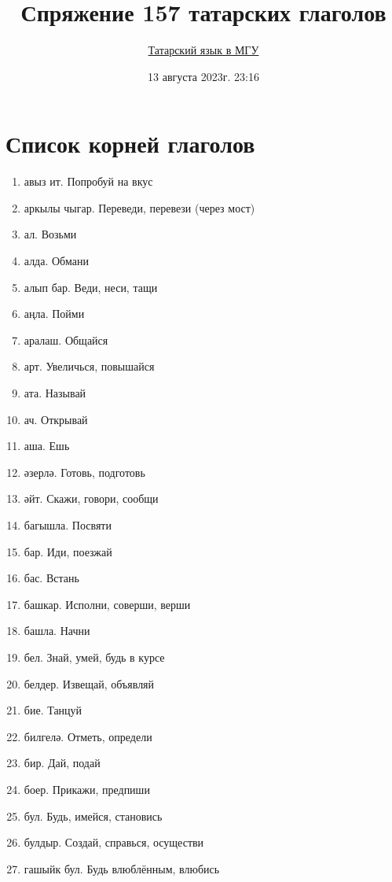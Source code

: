\documentclass{article}
\begin{document}
\title{\LARGE{\textbf{Спряжение 157 татарских глаголов}}}
\author{\href{https://vk.com/tatar.telem}{Татарский язык в МГУ}}
\date{13 августа 2023г. 23:16}

\maketitle

\tableofcontents

\section{Список корней глаголов}
\begin{enumerate}
    \item авыз ит. Попробуй на вкус
    \item аркылы чыгар. Переведи, перевези (через мост)
    \item ал. Возьми
    \item алда. Обмани
    \item алып бар. Веди, неси, тащи
    \item аңла. Пойми
    \item аралаш. Общайся
    \item арт. Увеличься, повышайся
    \item ата. Называй
    \item ач. Открывай
    \item аша. Ешь
    \item әзерлә. Готовь, подготовь
    \item әйт. Скажи, говори, сообщи
    \item багышла. Посвяти
    \item бар. Иди, поезжай
    \item бас. Встань
    \item башкар. Исполни, соверши, верши
    \item башла. Начни
    \item бел. Знай, умей, будь в курсе
    \item белдер. Извещай, объявляй
    \item бие. Танцуй
    \item билгелә. Отметь, определи
    \item бир. Дай, подай
    \item боер. Прикажи, предпиши
    \item бул. Будь, имейся, становись
    \item булдыр. Создай, справься, осуществи
    \item гашыйк бул. Будь влюблённым, влюбись

\end{enumerate}
\end{document}
